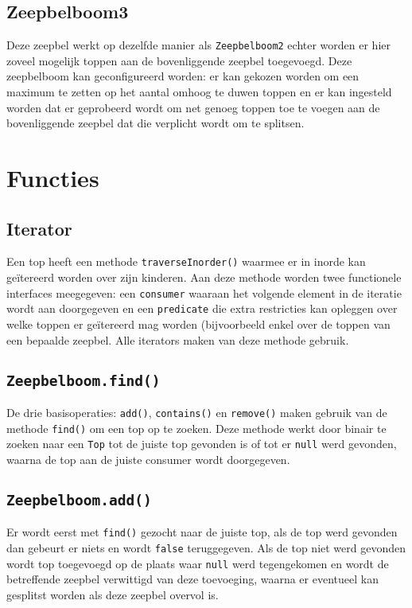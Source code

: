 \documentclass[12pt,hidelinks]{article}
\begin{document}
    \subsection{Zeepbelboom3}
    Deze zeepbel werkt op dezelfde manier als {\tt Zeepbelboom2} echter worden er hier
    zoveel mogelijk toppen aan de bovenliggende zeepbel toegevoegd. Deze zeepbelboom
    kan geconfigureerd worden: er kan gekozen worden om een maximum te zetten op het 
    aantal omhoog te duwen toppen en er kan ingesteld worden dat er geprobeerd wordt
    om net genoeg toppen toe te voegen aan de bovenliggende zeepbel dat die verplicht
    wordt om te splitsen.  
    \section{Functies}
    \subsection{Iterator}
    Een top heeft een methode {\tt traverseInorder()} waarmee er in inorde kan
    geïtereerd worden over zijn kinderen. Aan deze methode worden twee functionele
    interfaces meegegeven: een {\tt consumer} waaraan het volgende element in de iteratie
    wordt aan doorgegeven en een {\tt predicate} die extra restricties kan opleggen over
    welke toppen er geïtereerd mag worden (bijvoorbeeld enkel over de toppen van een
    bepaalde zeepbel.
    Alle iterators maken van deze methode gebruik.
    \subsection{\tt Zeepbelboom.find()}
    De drie basisoperaties: {\tt add()}, {\tt contains()} en {\tt remove()} maken gebruik
    van de methode {\tt find()} om een top op te zoeken. Deze methode werkt door binair
    te zoeken naar een {\tt Top} tot de juiste top gevonden is of tot er {\tt null} werd
    gevonden, waarna de top aan de juiste consumer wordt doorgegeven.
    \subsection{\tt Zeepbelboom.add()}
    Er wordt eerst met {\tt find()} gezocht naar de juiste top, als de top werd gevonden
    dan gebeurt er niets en wordt {\tt false} teruggegeven. Als de top niet werd gevonden
    wordt top toegevoegd op de plaats waar {\tt null} werd tegengekomen en wordt de
    betreffende zeepbel verwittigd van deze toevoeging, waarna er eventueel kan gesplitst
    worden als deze zeepbel overvol is.
\end{document}
